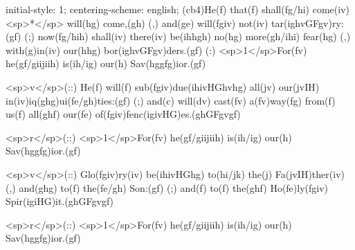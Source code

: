 initial-style: 1;
centering-scheme: english;
(cb4)He(f) that(f) shall(fg/hi) come(iv) <sp>*</sp> will(hg) come,(gh) (,) and(ge) will(fgiv) not(iv) tar(ighvGFgv)ry:(gf) (;) now(fg/hih) shall(iv) there(iv) be(ihhgh) no(hg) more(gh/ihi) fear(hg) (,) with(g)in(iv) our(hhg) bor(ighvGFgv)ders.(gf) (:) <sp>1</sp>For(fv) he(gf/giijiih) is(ih/ig) our(h) Sav(hggfg)ior.(gf) 

<sp>v</sp>(::) He(f) will(f) sub(fgiv)due(ihivHGhvhg) all(jv) our(jvIH) in(iv)iq(ghg)ui(fe/gh)ties:(gf) (;) and(c) will(dv) cast(fv) a(fv)way(fg) from(f) us(f) all(ghf) our(fe) of(fgiv)fenc(igivHG)es.(ghGFgvgf) 

<sp>r</sp>(::) <sp>1</sp>For(fv) he(gf/giijiih) is(ih/ig) our(h) Sav(hggfg)ior.(gf) 

<sp>v</sp>(::) Glo(fgiv)ry(iv) be(ihivHGhg) to(hi/jk) the(j) Fa(jvIH)ther(iv) (,) and(ghg) to(f) the(fe/gh) Son:(gf) (;) and(f) to(f) the(ghf) Ho(fe)ly(fgiv) Spir(igiHG)it.(ghGFgvgf)

<sp>r</sp>(::) <sp>1</sp>For(fv) he(gf/giijiih) is(ih/ig) our(h) Sav(hggfg)ior.(gf) 